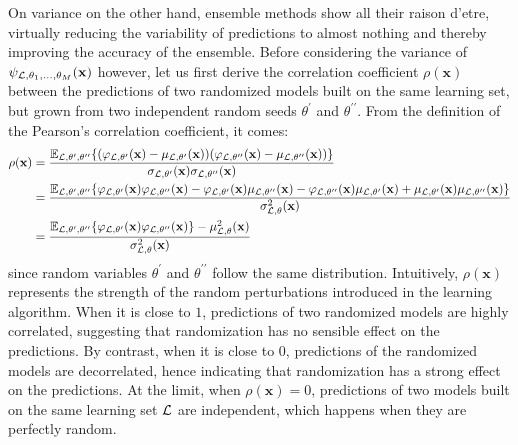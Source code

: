 On variance on the other hand, ensemble methods show all their raison d'etre,
virtually reducing the variability of predictions to almost nothing and thereby
improving the accuracy of the ensemble. Before considering the variance of
$\psi_{{\cal L},\theta_1,\dots,\theta_M}(\mathbf{x})$ however, let us first
derive the correlation coefficient $\rho(\mathbf{x})$ between the predictions
of two randomized models built on the same learning set, but grown from two
independent random seeds $\theta^\prime$ and $\theta^{\prime\prime}$. From the definition of the Pearson's correlation
coefficient, it comes:
\begin{align}
\rho(\mathbf{x}) &= \frac{\mathbb{E}_{{\cal L},\theta^\prime,\theta^{\prime\prime}} \{ (\varphi_{{\cal L}, \theta^\prime}(\mathbf{x}) - \mu_{{\cal L},\theta^\prime}(\mathbf{x})) (\varphi_{{\cal L}, \theta^{\prime\prime}}(\mathbf{x}) - \mu_{{\cal L},\theta^{\prime\prime}}(\mathbf{x})) \}}{\sigma_{{\cal L},\theta^\prime}(\mathbf{x}) \sigma_{{\cal L},\theta^{\prime\prime}}(\mathbf{x})} \nonumber \\
&= \frac{\mathbb{E}_{{\cal L},\theta^\prime,\theta^{\prime\prime}} \{ \varphi_{{\cal L},\theta^\prime}(\mathbf{x}) \varphi_{{\cal L},\theta^{\prime\prime}}(\mathbf{x}) - \varphi_{{\cal L},\theta^\prime}(\mathbf{x}) \mu_{{\cal L},\theta^{\prime\prime}}(\mathbf{x}) - \varphi_{{\cal L},\theta^{\prime\prime}}(\mathbf{x}) \mu_{{\cal L},\theta^\prime}(\mathbf{x}) + \mu_{{\cal L},\theta^\prime}(\mathbf{x}) \mu_{{\cal L},\theta^{\prime\prime}}(\mathbf{x}) \}}{\sigma^2_{{\cal L},\theta}(\mathbf{x})} \nonumber \\
&= \frac{\mathbb{E}_{{\cal L},\theta^\prime,\theta^{\prime\prime}} \{ \varphi_{{\cal L},\theta^\prime}(\mathbf{x}) \varphi_{{\cal L},\theta^{\prime\prime}}(\mathbf{x}) \} - \mu^2_{{\cal L},\theta}(\mathbf{x})}{\sigma^2_{{\cal L},\theta}(\mathbf{x})} \label{eqn:4:correlation}
\end{align}
since random variables $\theta^\prime$ and $\theta^{\prime\prime}$ follow the same
distribution. Intuitively, $\rho(\mathbf{x})$ represents the strength of the
random perturbations introduced in the learning algorithm. When it is close to
$1$, predictions of two randomized models are highly correlated, suggesting
that randomization has no sensible effect on the predictions. By contrast, when
it is close to $0$, predictions of the randomized models are decorrelated,
hence indicating that randomization has a strong effect on the predictions. At
the limit, when $\rho(\mathbf{x})=0$, predictions of two models built on the
same learning set ${\cal L}$ are independent, which happens when they are
perfectly random.


